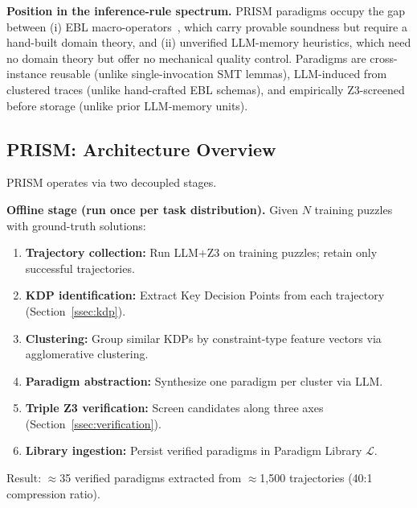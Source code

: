 \textbf{Position in the inference-rule spectrum.} PRISM paradigms occupy the gap between (i) EBL macro-operators~\citep{MitchellKellerKedarCabelli1986}, which carry provable soundness but require a hand-built domain theory, and (ii) unverified LLM-memory heuristics, which need no domain theory but offer no mechanical quality control. Paradigms are cross-instance reusable (unlike single-invocation SMT lemmas), LLM-induced from clustered traces (unlike hand-crafted EBL schemas), and empirically Z3-screened before storage (unlike prior LLM-memory units).

\subsection{PRISM: Architecture Overview}
\label{ssec:overview}

PRISM operates via two decoupled stages.

\textbf{Offline stage (run once per task distribution).} Given $N$ training puzzles with ground-truth solutions:
\begin{enumerate}
    \item \textbf{Trajectory collection:} Run LLM+Z3 on training puzzles; retain only successful trajectories.
    \item \textbf{KDP identification:} Extract Key Decision Points from each trajectory (Section~\ref{ssec:kdp}).
    \item \textbf{Clustering:} Group similar KDPs by constraint-type feature vectors via agglomerative clustering.
    \item \textbf{Paradigm abstraction:} Synthesize one paradigm per cluster via LLM.
    \item \textbf{Triple Z3 verification:} Screen candidates along three axes (Section~\ref{ssec:verification}).
    \item \textbf{Library ingestion:} Persist verified paradigms in Paradigm Library $\mathcal{L}$.
\end{enumerate}
Result: $\approx$35 verified paradigms extracted from $\approx$1,500 trajectories (40:1 compression ratio).

